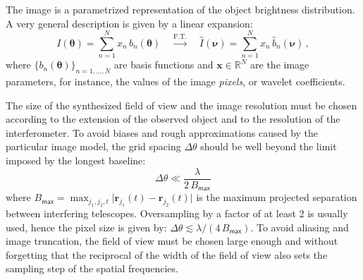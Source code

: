 \documentclass{article}
\newcommand{\Tag}[1]{\mathsf{#1}}        %
\newcommand{\V}[1]{\boldsymbol{#1}}      %
\newcommand{\FT}[1]{\hat{#1}}            %
\newcommand{\abs}[1]{\vert #1\vert}
\newcommand{\Reals}{\mathbb{R}}
\newcommand{\Freq}{\nu}               %
\newcommand{\VFreq}{\V{\Freq}}
\newcommand{\Dirn}{\theta}            %
\newcommand{\VDirn}{\V{\Dirn}}
\newcommand{\Posn}{r}                 %
\newcommand{\VPosn}{\V{\Posn}}
\newcommand{\Image}{I}
\newcommand{\Param}{x}
\newcommand{\VParam}{\V{\Param}}
\newcommand{\BasisFunc}{b}
\newcommand{\Baseline}{B}
\newcommand{\MaxBaseline}{\Baseline_\Tag{max}}
\begin{document}
The image is a parametrized representation of the object brightness
distribution.  A very general description is given by a linear expansion:
\begin{equation}
  \label{eq:general-image-model}
  \Image(\VDirn) = \sum_{n=1}^{N} \Param_n \, \BasisFunc_n(\VDirn)
  \quad \stackrel{\mathrm{F.T.}}{\longrightarrow}\quad
  \FT{\Image}(\VFreq) = \sum_{n=1}^{N} \Param_n \, \FT{\BasisFunc}_n(\VFreq)
  \,,  
\end{equation}
where $\{\BasisFunc_n(\VDirn)\}_{n=1,\ldots,N}$ are basis functions and
$\VParam\in\Reals^N$ are the image parameters, for instance, the values of the
image \emph{pixels}, or wavelet coefficients.


The size of the synthesized field of view and the image resolution must be
chosen according to the extension of the observed object and to the resolution
of the interferometer.  To avoid biases and rough approximations caused by the
particular image model, the grid spacing $\Delta\Dirn$ should be well beyond
the limit imposed by the longest baseline:
\begin{equation}
  \label{eq:diffraction-limit}
  \Delta\Dirn \ll \frac{\lambda}{2\,\MaxBaseline}
\end{equation}
where $\MaxBaseline=\max_{j_1,j_2,t}\abs{\VPosn_{j_1}(t) - \VPosn_{j_2}(t)}$
is the maximum projected separation between interfering telescopes.
Oversampling by a factor of at least 2 is usually used, hence the pixel size is
given by: $\Delta\Dirn \lesssim \lambda/(4\,\MaxBaseline)$.  To avoid aliasing
and image truncation, the field of view must be chosen large enough and
without forgetting that the reciprocal of the width of the field of view also
sets the sampling step of the spatial frequencies.
\end{document}

